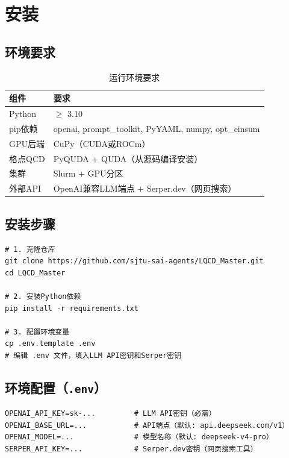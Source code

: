 \documentclass[12pt,a4paper]{ctexart}
\begin{document}
\section{安装}

\subsection{环境要求}

\begin{table}[H]
\centering
\caption{运行环境要求}
\label{tab:requirements}
\begin{tabular}{@{}ll@{}}
\toprule
\textbf{组件} & \textbf{要求} \\
\midrule
Python & $\ge$ 3.10 \\
pip依赖 & openai, prompt\_toolkit, PyYAML, numpy, opt\_einsum \\
GPU后端 & CuPy（CUDA或ROCm） \\
格点QCD & PyQUDA + QUDA（从源码编译安装） \\
集群 & Slurm + GPU分区 \\
外部API & OpenAI兼容LLM端点 + Serper.dev（网页搜索） \\
\bottomrule
\end{tabular}
\end{table}

\subsection{安装步骤}

\begin{lstlisting}[caption={LQCD Master 安装流程}, label={lst:install}]
# 1. 克隆仓库
git clone https://github.com/sjtu-sai-agents/LQCD_Master.git
cd LQCD_Master

# 2. 安装Python依赖
pip install -r requirements.txt

# 3. 配置环境变量
cp .env.template .env
# 编辑 .env 文件，填入LLM API密钥和Serper密钥
\end{lstlisting}

\subsection{环境配置（\texttt{.env}）}

\begin{lstlisting}[caption={.env 配置文件示例}, label={lst:env}]
OPENAI_API_KEY=sk-...         # LLM API密钥（必需）
OPENAI_BASE_URL=...           # API端点（默认: api.deepseek.com/v1）
OPENAI_MODEL=...              # 模型名称（默认: deepseek-v4-pro）
SERPER_API_KEY=...            # Serper.dev密钥（网页搜索工具）
\end{lstlisting}
\end{document}
